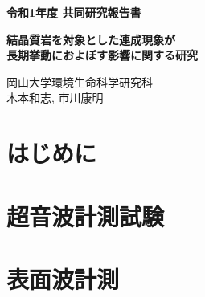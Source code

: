 ﻿\documentclass[11pt,a4j]{jarticle}
\newlength{\minitwocolumn}
\begin{document}
\newcommand{\fat}[1]{\mbox{\boldmath $#1$}}
\newcommand{\D}{\partial}
\newcommand{\w}{\omega}
\newcommand{\ga}{\alpha}
\newcommand{\gb}{\beta}
\newcommand{\gx}{\xi}
\newcommand{\gz}{\zeta}
\newcommand{\vhat}[1]{\hat{\fat{#1}}}
\newcommand{\spc}{\vspace{0.7\baselineskip}}
\newcommand{\halfspc}{\vspace{0.3\baselineskip}}

\pagestyle{empty}
\newcommand{\twofig}[2]
 {
   \begin{figure}[h]
     \begin{minipage}[t]{\minitwocolumn}
         \begin{center}   #1
         \end{center}
     \end{minipage}
         \hspace{\columnsep}
     \begin{minipage}[t]{\minitwocolumn}
         \begin{center} #2
         \end{center}
     \end{minipage}
   \end{figure}
 }
\begin{center}
{\Large \bf 令和1年度 共同研究報告書}
\end{center}
\vspace{2mm}
\begin{center}
{\LARGE \bf 結晶質岩を対象とした連成現象が\\
長期挙動におよぼす影響に関する研究} 
\end{center}
\begin{center}
岡山大学環境生命科学研究科\\
木本和志, 市川康明
\end{center}
\vspace{10mm}
\section{はじめに}
%
\section{超音波計測試験}

\section{表面波計測}
%
\end{document}
